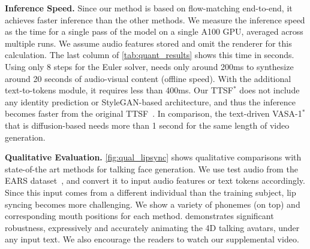 \noindent
\textbf{Inference Speed.} Since our method is based on flow-matching end-to-end, it achieves faster inference than the other methods. We measure the inference speed as the time for a single pass of the model on a single A100 GPU, averaged across multiple runs. We assume audio features stored
and omit the renderer for this calculation. The last column of \cref{tab:quant_results} shows this time in seconds. Using only 8 steps for the Euler solver, \MethodName needs only around 200ms to synthesize around 20 seconds of audio-visual content (offline speed). With the additional text-to-tokens module, it requires less than 400ms. Our TTSF$^{*}$ does not include any identity prediction or StyleGAN-based architecture, and thus the inference becomes faster from the original TTSF~\cite{Jang_2024_CVPR}. In comparison, the text-driven VASA-1$^{*}$ that is diffusion-based needs more than 1 second for the same length of video generation. 






\noindent
\textbf{Qualitative Evaluation.} 
\cref{fig:qual_lipsync} shows qualitative comparisons with state-of-the art methods for talking face generation. 
We use test audio from the EARS dataset~\cite{richter2024ears}, and convert it to input audio features or text tokens accordingly. Since this input comes from a different individual than the training subject, lip syncing becomes more challenging. We show a variety of phonemes (on top) and corresponding mouth positions for each method. \MethodName demonstrates significant robustness, expressively and accurately animating the 4D talking avatars, under any input text. We also encourage the readers to watch our supplemental video.










